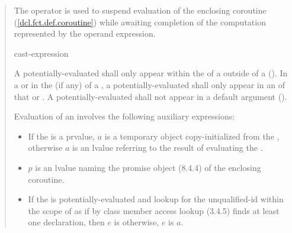 \begin{quote}
\pnum
The  operator is used to suspend evaluation of the enclosing coroutine (\ref{dcl.fct.def.coroutine}) while awaiting completion of the computation represented by the operand expression.

\begin{bnf}
  \br
   cast-expression
\end{bnf}

\pnum
A potentially-evaluated 
 shall only appear within the  of a  outside of a  ().
%
In a  or in the  (if any) of a , a potentially-evaluated  shall only appear in an  of that  or .
A potentially-evaluated  shall not appear in a default argument ().

\pnum
Evaluation of an  involves the following auxiliary expressions:

\begin{itemize}
  \item If the  is a prvalue, $a$ is a temporary object copy-initialized from the , otherwise $a$ is an lvalue referring to the result of evaluating the .
  \item $p$ is an lvalue naming the promise object (8.4.4) of the enclosing coroutine.
  \item If the  is potentially-evaluated and lookup for the unqualified-id  within the scope of  as if by class member access lookup (3.4.5) finds at least one declaration, then $e$ is  otherwise, $e$ is $a$.
    

\end{itemize}
\end{quote}
